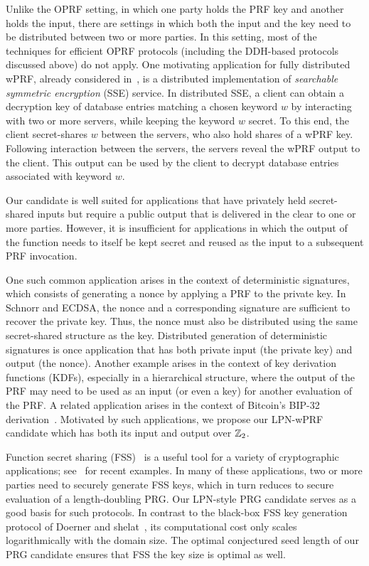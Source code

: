  Unlike the OPRF setting, in which one party holds the PRF key and another holds the input, there are settings in which both the input and the key need to be distributed between two or more parties. In this setting, most of the techniques for efficient OPRF protocols (including the DDH-based protocols discussed above) do not apply.
One motivating application for fully distributed wPRF,  already considered in~\cite{IshaiKLO16,boneh2018-darkmatter}, is a distributed implementation of {\em searchable symmetric encryption} (SSE) service. In distributed SSE, a client can obtain a decryption key of database entries matching a chosen keyword $w$ by interacting with two or more servers, while keeping the keyword $w$ secret.  To this end, the client secret-shares $w$ between the servers, who also hold shares of a wPRF key. Following interaction between the servers, the servers reveal the wPRF output to the client. This output can be used by the client to decrypt database entries associated with keyword $w$.

 Our \ttwPRF candidate is well suited for applications that have privately held secret-shared inputs but require a public output that is delivered in the clear to one or more parties. However, it is insufficient for applications in which the output of the function needs to itself be kept secret and reused as the input to a subsequent PRF invocation.

One such common application arises in the context of deterministic signatures, which consists of generating a nonce by applying a PRF to the private key. In Schnorr and ECDSA, the nonce and a corresponding signature are sufficient to recover the private key. Thus, the nonce must also be distributed using the same secret-shared structure as the key. Distributed generation of deterministic signatures is once application that has both private input (the private key) and output (the nonce). Another example arises in the context of key derivation functions (KDFs), especially in a hierarchical structure, where the output of the PRF may need to be used as an input (or even a key) for another evaluation of the PRF. A related application arises in the context of Bitcoin's BIP-32 derivation~\cite{bitcoin_bip0032}. Motivated by such applications, we propose our LPN-wPRF candidate which has both its input and output over $\mathbb{Z}_2$.

 Function secret sharing (FSS)~\cite{boyle2015-fss} is a useful tool for a variety of cryptographic applications; see~\cite{BoyleCGGIKR20,boyle2020-lpn-pcg} for recent examples. In many of these applications, two or more parties need to securely generate FSS keys, which in turn reduces to secure evaluation of a length-doubling PRG. Our LPN-style PRG candidate serves as a good basis for such protocols. In contrast to the black-box FSS key generation protocol of Doerner and shelat~\cite{DoernerS17}, its computational cost only scales logarithmically with the domain size. The optimal conjectured seed length of our PRG candidate ensures that FSS the key size is optimal as well.


